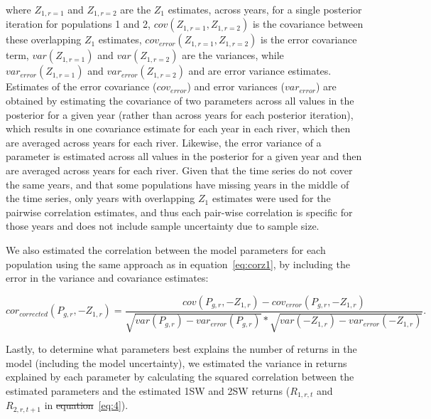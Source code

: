 \documentclass[12pt]{article}
\providecommand{\DIFaddtex}[1]{{\protect\color{blue}\uwave{#1}}} %
\providecommand{\DIFdeltex}[1]{{\protect\color{red}\sout{#1}}}                      %
\providecommand{\DIFaddbegin}{} %
\providecommand{\DIFaddend}{} %
\providecommand{\DIFdelbegin}{} %
\providecommand{\DIFdelend}{} %
\providecommand{\DIFadd}[1]{\texorpdfstring{\DIFaddtex{#1}}{#1}} %
\providecommand{\DIFdel}[1]{\texorpdfstring{\DIFdeltex{#1}}{}} %
\begin{document}

where $Z_{1,r=1}$ and $Z_{1,r=2}$ are the $Z_1$ estimates, across years, for a
single posterior iteration for populations 1 and 2,
$cov(Z_{1,r=1}, Z_{1,r=2})$ is the covariance between these overlapping $Z_1$ estimates,
$cov_{error}(Z_{1,r=1}, Z_{1,r=2})$ is the error covariance term,
$var(Z_{1,r=1})$ and $var(Z_{1,r=2})$ are the variances, while
$var_{error}(Z_{1,r=1})$ and $var_{error}(Z_{1,r=2})$ and are error variance estimates.
Estimates of the error covariance ($cov_{error}$) and error
variances ($var_{error}$) are obtained by estimating the covariance of
two parameters across all values in the posterior for a given year (rather
than across years for each posterior iteration), which results in one
covariance estimate for each year in each river, which then are averaged
across years for each river. Likewise, the error variance of a parameter is estimated
across all values in the posterior for a given year and then are averaged
across years for each river.
Given that the time series do not cover the same years, and that some populations
have missing years in the middle of the time series, only years with overlapping
$Z_1$ estimates were used for the pairwise correlation estimates, and thus
each pair-wise correlation is specific for those years and does not include sample uncertainty due to sample size.

We also estimated the correlation between the model parameters for each population using
the same approach as in equation~\ref{eq:corz1},
by including the error in the variance and covariance estimates:

\begin{equation}
cor_{corrected}(P_{g,r},-Z_{1,r}) = \frac{cov(P_{g,r}, -Z_{1,r}) - cov_{error}(P_{g,r}, -Z_{1,r})}{\sqrt{var(P_{g,r})- var_{error}(P_{g,r})}*\sqrt{var(-Z_{1,r}) - var_{error}(-Z_{1,r})}}\label{eq:corparam}.
\end{equation}

Lastly, to determine what parameters best explains the number of returns in
the model (including the model uncertainty), we estimated the variance in returns explained by each parameter by
calculating the squared correlation between the estimated parameters and the
estimated 1SW and 2SW returns ($R_{1,r,t}$ and $R_{2,r,t+1}$ in
\DIFdelbegin \DIFdel{equation}\DIFdelend \DIFaddbegin \DIFadd{equations~\ref{eq:3} and}\DIFaddend ~\ref{eq:4}).
\end{document}
